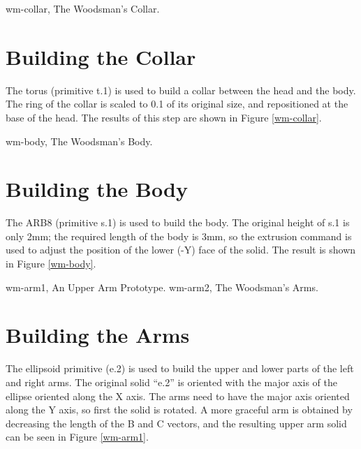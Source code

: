 
\mfig wm-collar, The Woodsman's Collar.
\section{Building the Collar}

The torus (primitive t.1) is used to build a collar between the head and
the body.
The ring of the collar is scaled to 0.1 of its original size,
and repositioned at the base of the head.
The results of this step are shown in Figure \ref{wm-collar}.


\mfig wm-body, The Woodsman's Body.
\section{Building the Body}

The ARB8 (primitive s.1) is used to build the body.
The original height of s.1 is only 2mm;  the required
length of the body is 3mm, so the extrusion command is
used to adjust the position of the lower (-Y) face of the solid.
The result is shown in Figure \ref{wm-body}.


\mfig wm-arm1, An Upper Arm Prototype.
\mfig wm-arm2, The Woodsman's Arms.
\section{Building the Arms}

The ellipsoid primitive (e.2) is used to build the upper and lower parts
of the left and right arms.
The original solid ``e.2'' is oriented with the major axis of the ellipse
oriented along the X axis.
The arms need to have the major axis oriented along the Y axis,
so first the solid is rotated.
A more graceful arm is obtained by decreasing the length of
the B and C vectors, and the resulting upper arm solid can be
seen in Figure \ref{wm-arm1}.

